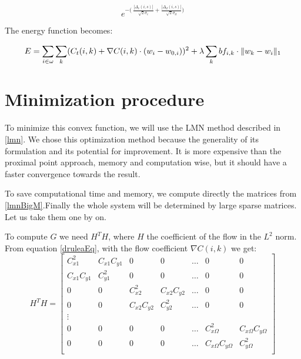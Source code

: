 \documentclass[12pt,a4paper,twoside]{report}
\begin{document}
{\begin{equation} \label{ourbilateralFilterTermLaplac}
e^{-\big(\ \frac{|\Delta_c(i,s)|}{\sqrt{2}\sigma_c}+ \frac{|\Delta_d(i,s)|}{\sqrt{2}\sigma_d}\big)}
\end{equation}

The energy function becomes:

\begin{equation} \label{druleaEq}
E = \sum_{i \in \omega} \sum_{k}
(C_t(i,k)+ \nabla C(i,k)\cdot(w_i-w_{0,i}))^2 + 
\lambda
\sum_k bf_{i,k} \cdot \Arrowvert w_k - w_i\Arrowvert_1
\end{equation}

\section{Minimization procedure} \label{minproclmn}



To minimize this convex function, we will use the LMN method described in \ref{lmn}. We chose this optimization method because the generality of its formulation and its potential for improvement. It is more expensive than the proximal point approach, memory and computation wise, but it should have a faster convergence towards the result. 

To save computational time and memory, we compute directly the matrices from \ref{lmnBigM}.Finally the whole system will be determined by large sparse matrices. Let us take them one by on.

To compute $G$ we need $H^T H$, where $H$ the coefficient of the flow in the $L^2$ norm. From equation \ref{druleaEq}, with the flow  coefficient  $\nabla C(i,k)$ we get:
\begin{equation}
	H^TH = \begin{bmatrix}
	C_{x1}^2 & C_{x1} C_{y1} & 0 & 0 & \ldots & 0 & 0 \\
	 C_{x1} C_{y1} & C_{y1}^2 & 0 & 0 & \ldots & 0 & 0 \\
	 0 & 0 & C_{x2}^2 & C_{x2} C_{y2} & \ldots & 0 & 0 \\
	  0 & 0 &  C_{x2} C_{y2} & C_{y2}^2 & \ldots & 0  & 0\\
	  \vdots\\
	   0 & 0 &  0  & 0  & \ldots & C_{x\Omega}^2 & C_{x\Omega} C_{y\Omega} \\
	  	   0 & 0 &  0  & 0  & \ldots & C_{x\Omega} C_{y\Omega} & C_{y\Omega}^2\\
	\end{bmatrix}
\end{equation}

}
\end{document}
